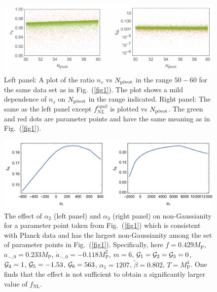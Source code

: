 \documentclass[a4paper,11pt]{article}
\begin{document}
  \begin{figure}
    \centering
    \includegraphics[width=1.0\textwidth]{figs/fig2.pdf}
    \caption{Left panel: A plot of the ratio $n_s$ vs $N_{\rm pivot}$ in the range $50-60$ for the same data set as in Fig.~(\ref{fig1}).
    The plot shows a mild dependence of $n_s$ on $N_{\rm pivot}$ in the range indicated. Right panel: The same as the left panel except
    $f^{equil}_{NL}$ is plotted vs $N_{\rm pivot}$.
    The green and red dots are parameter points and have the same meaning as in Fig.~(\ref{fig1}).}
    \label{fig2}
  \end{figure}

  \begin{figure}
  	\centering
  	\includegraphics[width=1.0\textwidth]{figs/fig3.pdf}
  	\caption{The effect of $\alpha_2$ (left panel) and $\alpha_3$ (right panel) on non-Gaussianity for a parameter point 
	taken from Fig.~(\ref{fig1}) which is consistent with 
	Planck data and has the  largest non-Gaussianity among the set of parameter points 
  in Fig.~(\ref{fig1}). Specifically, here $f = 0.429 M_\text{P}$, $a_{-, 0} = 0.233 M_\text{P}$, $\dot a_{-, 0} = -0.118 M_\text{P}^2$, $m = 6$, ${\cal{G}}_1 = {\cal{G}}_2 = {\cal{G}}_3 = 0$, ${\cal{G}}_4 = 1$, ${\cal{G}}_5 = -1.53$, ${\cal{G}}_6 = 563$, $\alpha_1 = 1207$, $\tilde \beta = 0.802$, $T = M_\text{P}^4$. One 
	finds that 
	 the effect is not sufficient to obtain a significantly larger value of $f_\text{NL}$.}
  	\label{fig3}
  \end{figure}
\end{document}
